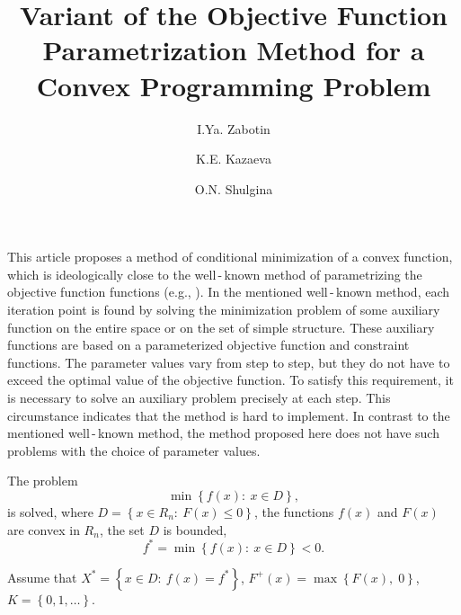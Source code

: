 \documentclass[12pt]{llncs}
\begin{document}
%

\fi

\title{Variant of the Objective Function Parametrization Method for a Convex Programming Problem}
%
%
\author{I.Ya. Zabotin  \and
K.E. Kazaeva  \and
O.N. Shulgina }
%
%
%
\maketitle              %
%
%
%
%
%
This article proposes a method of conditional minimization of a convex function, which is ideologically close to the well\,-\,known method of parametrizing the objective function functions (e.g., \cite{1,2}). In the mentioned well\,-\,known method, each iteration point is found by solving the minimization problem of some auxiliary function on the entire space or on the set of simple structure. These auxiliary functions are based on a parameterized objective function and constraint functions. The parameter values vary from step to step, but they do not have to exceed the optimal value of the objective function. To satisfy this requirement, it is necessary to solve an auxiliary problem precisely at each step. This circumstance indicates that the method is hard to implement. In contrast to the mentioned well\,-\,known method, the method proposed here does not have such problems with the choice of parameter values.

The problem
$$\min \left\{ {f\left( x \right):\:x \in D} \right\},
$$
is solved, where $D = \left\{ {x \in {R_n}:\:F\left( x \right) \leqslant 0} \right\}$, the functions $f(x)$ and $F(x)$ are convex in ${R_n}$, the set $D$ is bounded,
$${f^*} = \min \left\{ {f\left( x \right):\:x \in D} \right\} < 0.
$$

Assume that ${X^*} = \left\{ {x \in D:\:f\left( x \right) = {f^*}} \right\}$, ${F^ + }\left( x \right) = \max \left\{ {F\left( x \right),\;0} \right\}$, \break $K = \left\{ {0,1, \ldots } \right\}$. 
\end{document}
